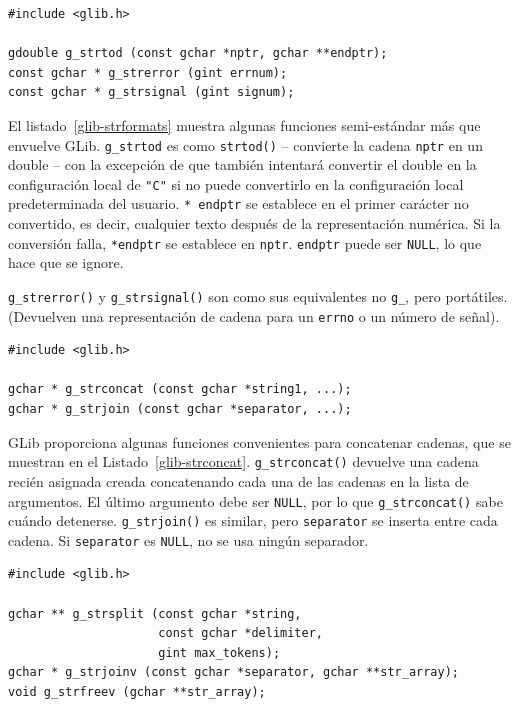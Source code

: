 \begin{lstlisting}[float, caption={String Conversions}, label=glib-strformats]
#include <glib.h>

gdouble g_strtod (const gchar *nptr, gchar **endptr);
const gchar * g_strerror (gint errnum);
const gchar * g_strsignal (gint signum);
\end{lstlisting}

El listado~\ref{glib-strformats} muestra algunas funciones semi-estándar más que envuelve GLib. \lstinline{g_strtod} es como \lstinline{strtod()} -- convierte la cadena \lstinline{nptr} en un double -- con la excepción de que también intentará convertir el double en la configuración local de \lstinline{"C"} si no puede convertirlo en la configuración local predeterminada del usuario. \lstinline{* endptr} se establece en el primer carácter no convertido, es decir, cualquier texto después de la representación numérica. Si la conversión falla, \lstinline{*endptr} se establece en \lstinline{nptr}. \lstinline{endptr} puede ser \lstinline{NULL}, lo que hace que se ignore.

\lstinline{g_strerror()} y \lstinline{g_strsignal()} son como sus equivalentes no \lstinline{g_}, pero portátiles. (Devuelven una representación de cadena para un \lstinline{errno} o un número de señal).

\begin{lstlisting}[float, caption={Concatenating Strings}, label=glib-strconcat]
#include <glib.h>

gchar * g_strconcat (const gchar *string1, ...);
gchar * g_strjoin (const gchar *separator, ...);
\end{lstlisting}

GLib proporciona algunas funciones convenientes para concatenar cadenas, que se muestran en el Listado~\ref{glib-strconcat}. \lstinline{g_strconcat()} devuelve una cadena recién asignada creada concatenando cada una de las cadenas en la lista de argumentos. El último argumento debe ser \lstinline{NULL}, por lo que \lstinline{g_strconcat()} sabe cuándo detenerse. \lstinline{g_strjoin()} es similar, pero \lstinline{separator} se inserta entre cada cadena. Si \lstinline {separator} es \lstinline{NULL}, no se usa ningún separador.

\begin{lstlisting}[float, caption={Manipulating \lstinline{NULL}-terminated string vectors}, label=glib-strvector]
#include <glib.h>

gchar ** g_strsplit (const gchar *string,
                     const gchar *delimiter,
                     gint max_tokens);
gchar * g_strjoinv (const gchar *separator, gchar **str_array);
void g_strfreev (gchar **str_array);
\end{lstlisting}

